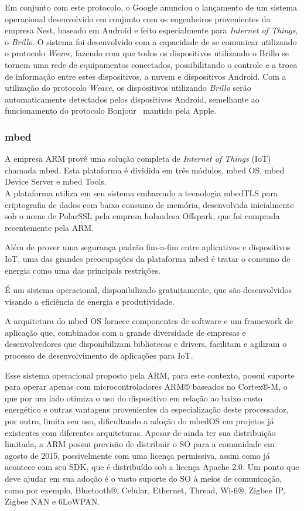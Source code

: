 Em conjunto com este protocolo, o Google anunciou o lançamento de um sistema operacional desenvolvido em
conjunto com os engenheiros provenientes da empresa Nest, baseado em Android e feito especialmente para
\textit{Internet of Things}, o \textit{Brillo}. O sistema foi desenvolvido com a capacidade de se comunicar
utilizando o protocolo \textit{Weave}, fazendo com que todos os dispositivos utilizando o Brillo se tornem
uma rede de equipamentos conectados, possibilitando o controle e a troca de informação entre estes dispositivos,
a nuvem e dispositivos Android. Com a utilização do protocolo \textit{Weave}, os dispositivos utilizando \textit{Brillo}
serão automaticamente detectados pelos dispositivos Android, semelhante ao funcionamento do protocolo Bonjour~\cite{Bonjour}
mantido pela Apple.

\subsubsection{mbed}
\label{subsec:mbed}
A empresa ARM provê uma solução completa de \textit{Internet of Things} (IoT) chamada mbed\cite{mbed}.
Esta plataforma é dividida em três módulos, mbed OS, mbed Device Server e mbed Tools.\\
A plataforma utiliza em seu sistema embarcado a tecnologia mbedTLS para criptografia de dados com baixo
consumo de memória, desenvolvida inicialmente sob o nome de PolarSSL pela empresa holandesa Offspark,
que foi comprada recentemente pela ARM.

Além de prover uma segurança padrão fim-a-fim entre aplicativos e dispositivos IoT, uma das grandes preocupações
da plataforma mbed é tratar o consumo de energia como uma das principais restrições.

É um sistema operacional, disponibilizado gratuitamente, que são desenvolvidos visando a eficiência
de energia e produtividade.

A arquitetura do mbed OS fornece componentes de software e um framework de aplicação que, combinados
com a grande diversidade de empresas e desenvolvedores que disponibilizam bibliotecas e drivers, facilitam
e agilizam o processo de desenvolvimento de aplicações para IoT.

Esse sistema operacional proposto pela ARM, para este contexto, possui suporte para operar apenas com microcontroladores
ARM® baseados no Cortex®-M, o que por um lado otimiza o uso do dispositivo em relação ao baixo custo energético
e outras vantagens provenientes da especialização deste processador, por outro, limita seu uso, dificultando
a adoção do mbedOS em projetos já existentes com diferentes arquiteturas.
Apesar de ainda ter sua distribuição limitada, a ARM possui previsão de distribuir o SO para a comunidade em agosto de 2015,
possivelmente com uma licença permissiva, assim como já acontece com seu SDK, que é distribuído sob a licença Apache 2.0.
Um ponto que deve ajudar em sua adoção é o vasto suporte do SO à meios de comunicação, como por exemplo,
Bluetooth®, Celular, Ethernet, Thread, Wi-fi®,  Zigbee IP, Zigbee NAN e 6LoWPAN.

